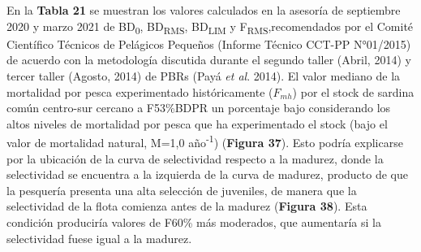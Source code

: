 \documentclass[
  spanish,
]{article}
\begin{document}
En la \textbf{Tabla 21} se muestran los valores calculados en la
asesoría de septiembre 2020 y marzo 2021 de BD\textsubscript{0},
BD\textsubscript{RMS}, BD\textsubscript{LIM} y
F\textsubscript{RMS},recomendados por el Comité Científico Técnicos de
Pelágicos Pequeños (Informe Técnico CCT-PP N°01/2015) de acuerdo con la
metodología discutida durante el segundo taller (Abril, 2014) y tercer
taller (Agosto, 2014) de PBRs (Payá \emph{et al}. 2014). El valor
mediano de la mortalidad por pesca experimentado históricamente
(\(F_{mh}\)) por el stock de sardina común centro-sur cercano a
F53\%BDPR un porcentaje bajo considerando los altos niveles de
mortalidad por pesca que ha experimentado el stock (bajo el valor de
mortalidad natural, M=1,0 año\textsuperscript{-1}) (\textbf{Figura 37}).
Esto podría explicarse por la ubicación de la curva de selectividad
respecto a la madurez, donde la selectividad se encuentra a la izquierda
de la curva de madurez, producto de que la pesquería presenta una alta
selección de juveniles, de manera que la selectividad de la flota
comienza antes de la madurez (\textbf{Figura 38}). Esta condición
produciría valores de F60\% más moderados, que aumentaría si la
selectividad fuese igual a la madurez.
\end{document}
